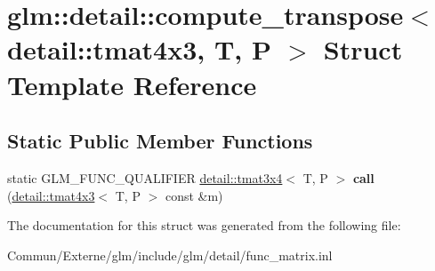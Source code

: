 \hypertarget{structglm_1_1detail_1_1compute__transpose_3_01detail_1_1tmat4x3_00_01_t_00_01_p_01_4}{}\section{glm\+:\+:detail\+:\+:compute\+\_\+transpose$<$ detail\+:\+:tmat4x3, T, P $>$ Struct Template Reference}
\label{structglm_1_1detail_1_1compute__transpose_3_01detail_1_1tmat4x3_00_01_t_00_01_p_01_4}
\subsection*{Static Public Member Functions}
\begin{DoxyCompactItemize}
\item 
static G\+L\+M\+\_\+\+F\+U\+N\+C\+\_\+\+Q\+U\+A\+L\+I\+F\+I\+ER \hyperlink{structglm_1_1detail_1_1tmat3x4}{detail\+::tmat3x4}$<$ T, P $>$ {\bfseries call} (\hyperlink{structglm_1_1detail_1_1tmat4x3}{detail\+::tmat4x3}$<$ T, P $>$ const \&m)\hypertarget{structglm_1_1detail_1_1compute__transpose_3_01detail_1_1tmat4x3_00_01_t_00_01_p_01_4_aba1245556b2c86727dfb37d64f6a9b9a}{}\label{structglm_1_1detail_1_1compute__transpose_3_01detail_1_1tmat4x3_00_01_t_00_01_p_01_4_aba1245556b2c86727dfb37d64f6a9b9a}

\end{DoxyCompactItemize}


The documentation for this struct was generated from the following file\+:\begin{DoxyCompactItemize}
\item 
Commun/\+Externe/glm/include/glm/detail/func\+\_\+matrix.\+inl\end{DoxyCompactItemize}
